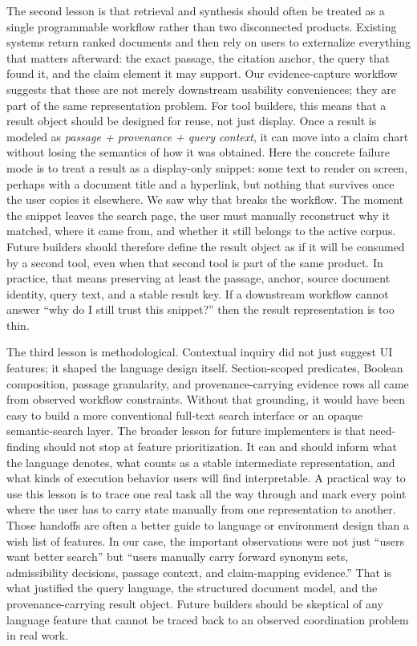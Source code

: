 \documentclass[sigconf]{acmart}
\begin{document}
The second lesson is that retrieval and synthesis should often be treated as a
single programmable workflow rather than two disconnected products. Existing
systems return ranked documents and then rely on users to externalize
everything that matters afterward: the exact passage, the citation anchor, the
query that found it, and the claim element it may support. Our evidence-capture
workflow suggests that these are not merely downstream usability conveniences;
they are part of the same representation problem. For tool builders, this means
that a result object should be designed for reuse, not just display. Once a
result is modeled as \emph{passage + provenance + query context}, it can move
into a claim chart without losing the semantics of how it was obtained. Here the
concrete failure mode is to treat a result as a display-only snippet: some text
to render on screen, perhaps with a document title and a hyperlink, but nothing
that survives once the user copies it elsewhere. We saw why that breaks the
workflow. The moment the snippet leaves the search page, the user must manually
reconstruct why it matched, where it came from, and whether it still belongs to
the active corpus. Future builders should therefore define the result object as
if it will be consumed by a second tool, even when that second tool is part of
the same product. In practice, that means preserving at least the passage,
anchor, source document identity, query text, and a stable result key. If a
downstream workflow cannot answer ``why do I still trust this snippet?'' then
the result representation is too thin.

The third lesson is methodological. Contextual inquiry did not just suggest UI
features; it shaped the language design itself. Section-scoped predicates,
Boolean composition, passage granularity, and provenance-carrying evidence rows
all came from observed workflow constraints. Without that grounding, it would
have been easy to build a more conventional full-text search interface or an
opaque semantic-search layer. The broader lesson for future implementers is
that need-finding should not stop at feature prioritization. It can and should
inform what the language denotes, what counts as a stable intermediate
representation, and what kinds of execution behavior users will find
interpretable. A practical way to use this lesson is to trace one real task all
the way through and mark every point where the user has to carry state manually
from one representation to another. Those handoffs are often a better guide to
language or environment design than a wish list of features. In our case, the
important observations were not just ``users want better search'' but ``users
manually carry forward synonym sets, admissibility decisions, passage context,
and claim-mapping evidence.'' That is what justified the query language, the
structured document model, and the provenance-carrying result object. Future
builders should be skeptical of any language feature that cannot be traced back
to an observed coordination problem in real work.
\end{document}

